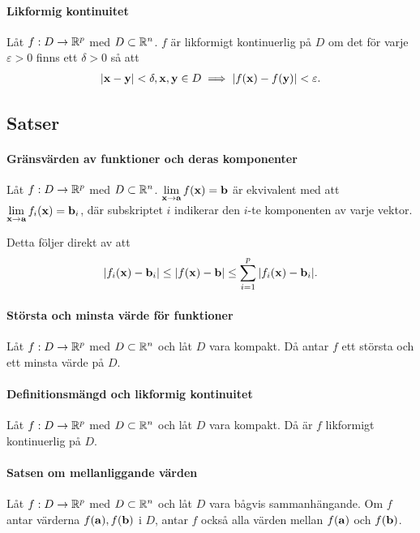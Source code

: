 \paragraph{Likformig kontinuitet}
Låt $f: D\to\mathbb{R}^p$ med $D\subset\mathbb{R}^n$. $f$ är likformigt kontinuerlig på $D$ om det för varje $\varepsilon > 0$ finns ett $\delta > 0$ så att
\begin{align*}
	\abs{\vect{x} - \vect{y}} < \delta, \vect{x}, \vect{y}\in D \implies\abs{f(\vect{x}) - f(\vect{y})} < \varepsilon.
\end{align*}

\subsection{Satser}

\paragraph{Gränsvärden av funktioner och deras komponenter}
Låt $f: D\to\mathbb{R}^p$ med $D\subset\mathbb{R}^n$. $\limit{\vect{x}}{\vect{a}}f(\vect{x}) = \vect{b}$ är ekvivalent med att $\limit{\vect{x}}{\vect{a}}f_i(\vect{x}) = \vect{b}_i$, där subskriptet $i$ indikerar den $i$-te komponenten av varje vektor.

\proof
Detta följer direkt av att
\begin{align*}
	\abs{f_i(\vect{x}) - \vect{b}_i}\leq\abs{f(\vect{x}) - \vect{b}}\leq\sum\limits_{i = 1}^{p}\abs{f_i(\vect{x}) - \vect{b}_i}.
\end{align*}

\paragraph{Största och minsta värde för funktioner}
Låt $f: D\to\mathbb{R}^p$ med $D\subset\mathbb{R}^n$ och låt $D$ vara kompakt. Då antar $f$ ett största och ett minsta värde på $D$.

\proof

\paragraph{Definitionsmängd och likformig kontinuitet}
Låt $f: D\to\mathbb{R}^p$ med $D\subset\mathbb{R}^n$ och låt $D$ vara kompakt. Då är $f$ likformigt kontinuerlig på $D$.

\proof

\paragraph{Satsen om mellanliggande värden}
Låt $f: D\to\mathbb{R}^p$ med $D\subset\mathbb{R}^n$ och låt $D$ vara bågvis sammanhängande. Om $f$ antar värderna $f(\vect{a}), f(\vect{b})$ i $D$, antar $f$ också alla värden mellan $f(\vect{a})$ och $f(\vect{b})$.

\proof